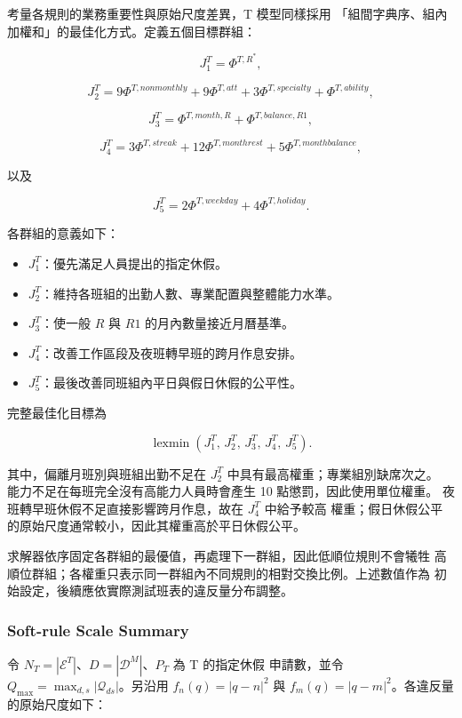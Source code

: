 \documentclass[12pt]{article}
\begin{document}
考量各規則的業務重要性與原始尺度差異，T 模型同樣採用
「組間字典序、組內加權和」的最佳化方式。定義五個目標群組：

\[
  J^T_1=\Phi^{T,R^*},
\]

\[
  J^T_2
  =
  9\Phi^{T,nonmonthly}
  +9\Phi^{T,att}
  +3\Phi^{T,specialty}
  +\Phi^{T,ability},
\]

\[
  J^T_3
  =
  \Phi^{T,month,R}
  +\Phi^{T,balance,R1},
\]

\[
  J^T_4
  =
  3\Phi^{T,streak}
  +12\Phi^{T,monthrest}
  +5\Phi^{T,monthbalance},
\]

以及

\[
  J^T_5
  =
  2\Phi^{T,weekday}
  +4\Phi^{T,holiday}.
\]

各群組的意義如下：

\begin{itemize}
  \item \(J^T_1\)：優先滿足人員提出的指定休假。
  \item \(J^T_2\)：維持各班組的出勤人數、專業配置與整體能力水準。
  \item \(J^T_3\)：使一般 \(R\) 與 \(R1\) 的月內數量接近月曆基準。
  \item \(J^T_4\)：改善工作區段及夜班轉早班的跨月作息安排。
  \item \(J^T_5\)：最後改善同班組內平日與假日休假的公平性。
\end{itemize}

完整最佳化目標為

\[
  \operatorname{lexmin}
  \left(
    J^T_1,\,
    J^T_2,\,
    J^T_3,\,
    J^T_4,\,
    J^T_5
  \right).
\]

其中，偏離月班別與班組出勤不足在 \(J^T_2\) 中具有最高權重；專業組別缺席次之。
能力不足在每班完全沒有高能力人員時會產生 10 點懲罰，因此使用單位權重。
夜班轉早班休假不足直接影響跨月作息，故在 \(J^T_4\) 中給予較高
權重；假日休假公平的原始尺度通常較小，因此其權重高於平日休假公平。

求解器依序固定各群組的最優值，再處理下一群組，因此低順位規則不會犧牲
高順位群組；各權重只表示同一群組內不同規則的相對交換比例。上述數值作為
初始設定，後續應依實際測試班表的違反量分布調整。
\subsubsection{Soft-rule Scale Summary}

令 \(N_T=|\mathcal{E}^{T}|\)、\(D=|\mathcal{D}^{M}|\)、\(P_T\) 為 T 的指定休假
申請數，並令 \(Q_{\max}=\max_{d,s}|\mathcal{Q}_{ds}|\)。另沿用
\(f_n(q)=|q-n|^2\) 與
\(f_m(q)=|q-m|^2\)。各違反量的原始尺度如下：
\end{document}
